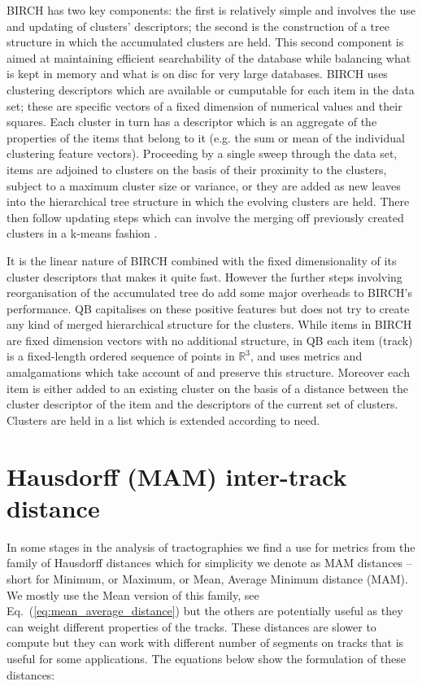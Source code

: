 \documentclass[journal]{IEEEtran}
\begin{document}
BIRCH has two key components: the first is relatively simple and
involves the use and updating of clusters' descriptors; the second is
the construction of a tree structure in which the accumulated clusters
are held. This second component is aimed at maintaining efficient
searchability of the database while balancing what is kept in memory and
what is on disc for very large databases. BIRCH uses clustering
descriptors which are available or cumputable for each item in the data
set; these are specific vectors of a fixed dimension of numerical values
and their squares. Each cluster in turn has a descriptor which is an
aggregate of the properties of the items that belong to it (e.g. the sum
or mean of the individual clustering feature vectors). Proceeding by a
single sweep through the data set, items are adjoined to clusters on the
basis of their proximity to the clusters, subject to a maximum cluster
size or variance, or they are added as new leaves into the hierarchical
tree structure in which the evolving clusters are held. There then
follow updating steps which can involve the merging off previously
created clusters in a k-means fashion \cite{steinhaus1956division,
  macqueen1967some}.

It is the linear nature of BIRCH combined with the fixed dimensionality
of its cluster descriptors that makes it quite fast. However the further
steps involving reorganisation of the accumulated tree do add some major
overheads to BIRCH's performance. QB capitalises on these positive
features but does not try to create any kind of merged hierarchical
structure for the clusters. While items in BIRCH are fixed dimension
vectors with no additional structure, in QB each item (track) is a
fixed-length ordered sequence of points in $\mathbb{R}^{3}$, and uses
metrics and amalgamations which take account of and preserve this
structure.  Moreover each item is either added to an existing cluster on
the basis of a distance between the cluster descriptor of the item and
the descriptors of the current set of clusters. Clusters are held in a
list which is extended according to need.

\section{Hausdorff (MAM) inter-track distance}

In some stages in the analysis of tractographies we find a use for
metrics from the family of Hausdorff distances which for simplicity we
denote as MAM distances -- short for Minimum, or Maximum, or Mean,
Average Minimum distance (MAM). We mostly use the Mean version of this
family, see Eq.~(\ref{eq:mean_average_distance}) but the others are
potentially useful as they can weight different properties of the
tracks. These distances are slower to compute but they can work with
different number of segments on tracks that is useful for some
applications. The equations below show the formulation of these
distances:
\end{document}
